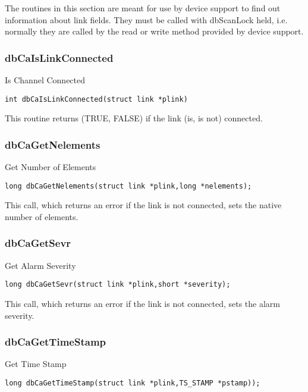 The routines in this section are meant for use by device support to find out information about link fields. They must be 
called with dbScanLock held, i.e. normally they are called by the read or write method provided by device support.

\subsubsection{dbCaIsLinkConnected}

Is Channel Connected

\begin{verbatim}
int dbCaIsLinkConnected(struct link *plink)
\end{verbatim}

This routine returns (TRUE, FALSE) if the link (is, is not) connected.

\subsubsection{dbCaGetNelements}

Get Number of Elements

\begin{verbatim}
long dbCaGetNelements(struct link *plink,long *nelements);
\end{verbatim}

This call, which returns an error if the link is not connected, sets the native number of elements.

\subsubsection{dbCaGetSevr}

Get Alarm Severity

\begin{verbatim}
long dbCaGetSevr(struct link *plink,short *severity);
\end{verbatim}

This call, which returns an error if the link is not connected, sets the alarm severity.

\subsubsection{dbCaGetTimeStamp}

Get Time Stamp

\begin{verbatim}
long dbCaGetTimeStamp(struct link *plink,TS_STAMP *pstamp));
\end{verbatim}

